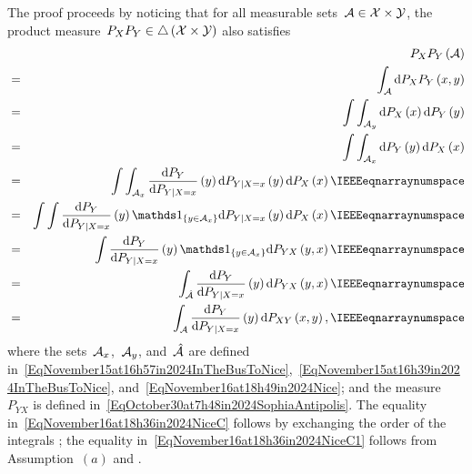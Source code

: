\documentclass[lettersize,onecolumn]{IEEEtran}
\begin{document}
\begin{IEEEproof}
The proof proceeds by noticing that for all measurable sets~$\mathcal A \in \mathcal X \times \mathcal Y$,  the product measure~$P_{X}P_{Y} \in \triangle\left( \mathcal X \times \mathcal Y \right)$ also satisfies
\begin{eqnarray}
\nonumber
& & P_{X}P_{Y}  \left(\set{A} \right)  \\
\label{EqNovember16at18h36in2024NiceA}
& = &\int_{\set{A}} \mathrm{d}P_{X}P_{Y}  \left( x, y\right) \\
\label{EqNovember16at18h36in2024NiceB}
& = &\int \int_{\set{A}_{y}} \mathrm{d}P_{X}\left( x\right)  \mathrm{d}P_{Y}  \left(y\right) \\
\label{EqNovember16at18h36in2024NiceC}
& = &\int \int_{\set{A}_{x}}  \mathrm{d}P_{Y}  \left(y\right) \mathrm{d}P_{X}\left( x\right)  \\
\label{EqNovember16at18h36in2024NiceC1}
& = &\int \int_{\set{A}_{x}}  \frac{\mathrm{d}P_{Y}}{\mathrm{d}P_{Y | X = x}} \left( y \right) \mathrm{d}P_{Y | X = x} \left( y \right)  \mathrm{d}P_{X}  \left(x\right) \spnum \\
\label{EqNovember16at18h36in2024NiceD}
& = &\int \int  \frac{\mathrm{d}P_{Y}}{\mathrm{d}P_{Y | X = x}} \left( y \right) \ind{y \in \set{A}_{x}} \mathrm{d}P_{Y | X = x} \left( y \right)  \mathrm{d}P_{X}  \left(x\right) \spnum \\
\label{EqNovember16at18h36in2024NiceE}
& = &\int   \frac{\mathrm{d}P_{Y}}{\mathrm{d}P_{Y | X = x}} \left( y \right) \ind{y \in \set{A}_{x}} \mathrm{d}P_{YX}  \left(y, x\right) \spnum \\
\label{EqNovember16at18h36in2024NiceF}
& = &\int_{\hat{\set{A}}}   \frac{\mathrm{d}P_{Y}}{\mathrm{d}P_{Y | X = x}} \left( y \right) \mathrm{d}P_{YX}  \left(y, x\right) \spnum \\
\label{EqNovember16at18h36in2024NiceG}
& = &\int_{\set{A}}   \frac{\mathrm{d}P_{Y}}{\mathrm{d}P_{Y | X = x}} \left( y \right) \mathrm{d}P_{XY}  \left(x,y\right), \spnum 
\end{eqnarray}
where the sets~$\mathcal A_{x}$,~$\mathcal A_{y}$, and~$\hat{\mathcal A}$ are defined in~\eqref{EqNovember15at16h57in2024InTheBusToNice},~\eqref{EqNovember15at16h39in2024InTheBusToNice}, and~\eqref{EqNovember16at18h49in2024Nice}; and the measure~$P_{YX}$ is defined in~\eqref{EqOctober30at7h48in2024SophiaAntipolis}.
%
The equality in~\eqref{EqNovember16at18h36in2024NiceC} follows by exchanging the order of the integrals \cite[Theorem~$2.6.6$]{ash2000probability}; 
the equality in~\eqref{EqNovember16at18h36in2024NiceC1} follows from Assumption~$(a)$ and \cite[Theorem~$2.2.3$]{lehmann2005testing}.


\end{IEEEproof}
\end{document}

